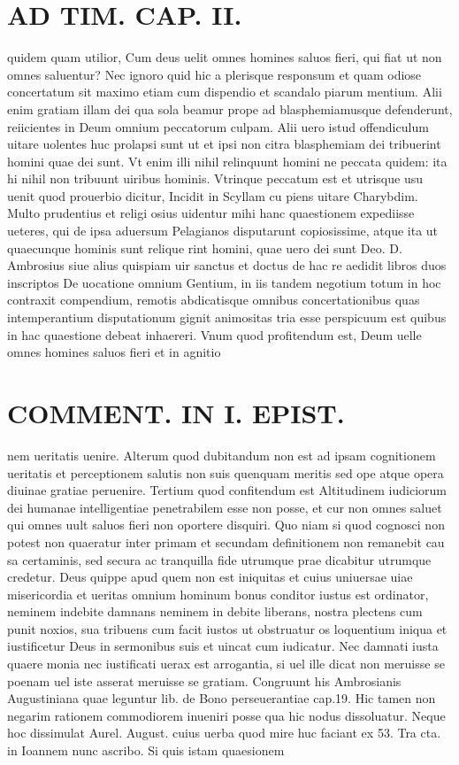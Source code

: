\documentclass{article}
\begin{document}
\begin{pages}
\section*{AD TIM. CAP. II. }
\marginpar{[ p.114 ]}\pstart quidem quam utilior, Cum deus uelit omnes homines saluos fieri, qui fiat ut non omnes saluentur? Nec ignoro quid hic a plerisque responsum et quam odiose concertatum sit maximo etiam cum dispendio et scandalo piarum mentium. Alii enim gratiam illam dei qua sola beamur prope ad blasphemiamusque defenderunt, reiicientes in Deum omnium peccatorum culpam. Alii uero istud offendiculum uitare uolentes huc prolapsi sunt ut et ipsi non citra blasphemiam dei tribuerint homini quae dei sunt. Vt enim illi nihil relinquunt homini ne peccata quidem: ita hi nihil non tribuunt uiribus hominis. Vtrinque peccatum est et utrisque usu uenit quod prouerbio dicitur, Incidit in Scyllam cu piens uitare Charybdim. Multo prudentius et religi osius uidentur mihi hanc quaestionem expediisse ueteres, qui de ipsa aduersum Pelagianos disputarunt copiosissime, atque ita ut quaecunque hominis sunt relique rint homini, quae uero dei sunt Deo. D. Ambrosius siue alius quispiam uir sanctus et doctus de hac re aedidit libros duos inscriptos De uocatione omnium Gentium, in iis tandem negotium totum in hoc contraxit compendium, remotis abdicatisque omnibus concertationibus quas intemperantium disputationum gignit animositas tria esse perspicuum est quibus in hac quaestione debeat inhaereri. Vnum quod profitendum est, Deum uelle omnes homines saluos fieri et in agnitio  \pend
\section*{COMMENT. IN I. EPIST. }\pstart nem ueritatis uenire. Alterum quod dubitandum non est ad ipsam cognitionem ueritatis et perceptionem salutis non suis quenquam meritis sed ope atque opera diuinae gratiae peruenire. Tertium quod confitendum est Altitudinem iudiciorum dei humanae intelligentiae penetrabilem esse non posse, et cur non omnes saluet qui omnes uult saluos fieri non oportere disquiri. Quo niam si quod cognosci non potest non quaeratur inter primam et secundam definitionem non remanebit cau sa certaminis, sed secura ac tranquilla fide utrumque prae dicabitur utrumque credetur. Deus quippe apud quem non est iniquitas et cuius uniuersae uiae misericordia et ueritas omnium hominum bonus conditor iustus est ordinator, neminem indebite damnans neminem in debite liberans, nostra plectens cum punit noxios, sua tribuens cum facit iustos ut obstruatur os loquentium iniqua et iustificetur Deus in sermonibus suis et uincat cum iudicatur. Nec damnati iusta quaere monia nec iustificati uerax est arrogantia, si uel ille dicat non meruisse se poenam uel iste asserat meruisse se gratiam. Congruunt his Ambrosianis Augustiniana quae leguntur lib. de Bono perseuerantiae cap.19. Hic tamen non negarim rationem commodiorem inueniri posse qua hic nodus dissoluatur. Neque hoc dissimulat Aurel. August. cuius uerba quod mire huc faciant ex 53. Tra cta. in Ioannem nunc ascribo. Si quis istam quaesionem  \pend

\end{pages}
\end{document}
